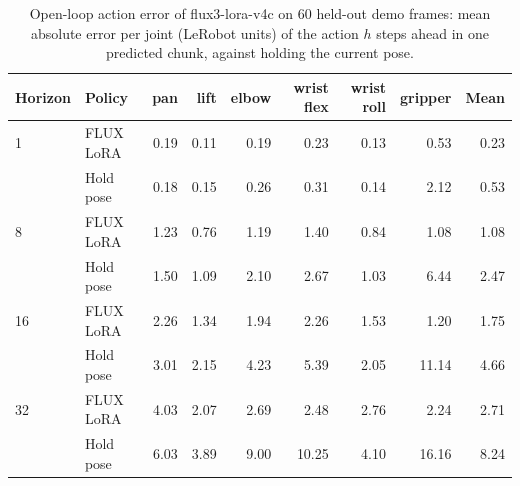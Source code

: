 \begin{table}[t]
\centering
\small
\begin{tabular}{llrrrrrrr}
\toprule
Horizon & Policy & pan & lift & elbow & wrist flex & wrist roll & gripper & Mean \\
\midrule
1 & FLUX LoRA & 0.19 & 0.11 & 0.19 & 0.23 & 0.13 & 0.53 & 0.23 \\
 & Hold pose & 0.18 & 0.15 & 0.26 & 0.31 & 0.14 & 2.12 & 0.53 \\
\midrule
8 & FLUX LoRA & 1.23 & 0.76 & 1.19 & 1.40 & 0.84 & 1.08 & 1.08 \\
 & Hold pose & 1.50 & 1.09 & 2.10 & 2.67 & 1.03 & 6.44 & 2.47 \\
\midrule
16 & FLUX LoRA & 2.26 & 1.34 & 1.94 & 2.26 & 1.53 & 1.20 & 1.75 \\
 & Hold pose & 3.01 & 2.15 & 4.23 & 5.39 & 2.05 & 11.14 & 4.66 \\
\midrule
32 & FLUX LoRA & 4.03 & 2.07 & 2.69 & 2.48 & 2.76 & 2.24 & 2.71 \\
 & Hold pose & 6.03 & 3.89 & 9.00 & 10.25 & 4.10 & 16.16 & 8.24 \\
\bottomrule
\end{tabular}
\caption{Open-loop action error of flux3-lora-v4c on 60 held-out demo frames: mean absolute error per joint (LeRobot units) of the action $h$ steps ahead in one predicted chunk, against holding the current pose.}
\label{tab:flux-openloop}
\end{table}
